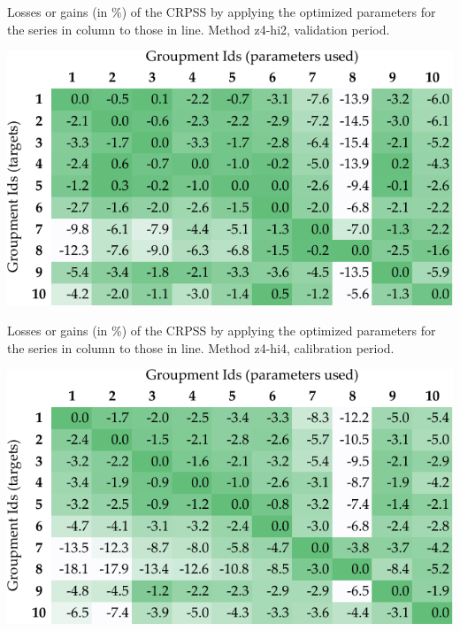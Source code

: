 \documentclass[5p]{elsarticle}
\begin{document}
\begin{table}[htb]
	\caption{Losses or gains (in \%) of the CRPSS by applying the optimized parameters for the series in column to those in line. Method z4-hi2, validation period.}
	\centerline{\includegraphics[width=\linewidth]{figures/table_crossing_z4-hi2_valid.pdf}}
	\label{table:crossing_z4-hi2_valid}
\end{table}

\begin{table}[htb]
	\caption{Losses or gains (in \%) of the CRPSS by applying the optimized parameters for the series in column to those in line. Method z4-hi4, calibration period.}
	\centerline{\includegraphics[width=\linewidth]{figures/table_crossing_z4-hi4_calib.pdf}}
	\label{table:crossing_z4-hi4_calib}
\end{table}
\end{document}
